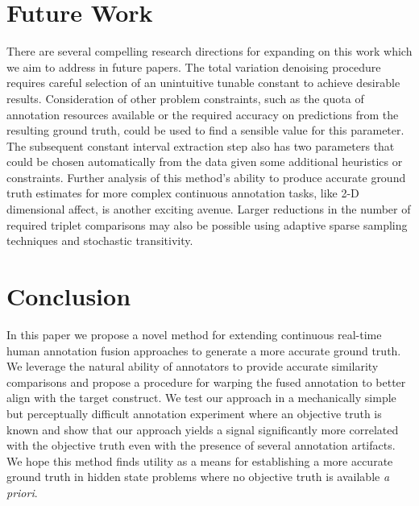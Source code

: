 \documentclass[times,twocolumn,final,authoryear]{elsarticle}
\begin{document}
\section{Future Work}
There are several compelling research directions for expanding on this work which we aim to address in future papers.  The total variation denoising procedure requires careful selection of an unintuitive tunable constant to achieve desirable results.  Consideration of other problem constraints, such as the quota of annotation resources available or the required accuracy on predictions from the resulting ground truth, could be used to find a sensible value for this parameter.  The subsequent constant interval extraction step also has two parameters that could be chosen automatically from the data given some additional heuristics or constraints.  Further analysis of this method's ability to produce accurate ground truth estimates for more complex continuous annotation tasks, like 2-D dimensional affect, is another exciting avenue.  Larger reductions in the number of required triplet comparisons may also be possible using adaptive sparse sampling techniques and stochastic transitivity.

\section{Conclusion}
In this paper we propose a novel method for extending continuous real-time human annotation fusion approaches to generate a more accurate ground truth.  We leverage the natural ability of annotators to provide accurate similarity comparisons and propose a procedure for warping the fused annotation to better align with the target construct.  We test our approach in a mechanically simple but perceptually difficult annotation experiment where an objective truth is known and show that our approach yields a signal significantly more correlated with the objective truth even with the presence of several annotation artifacts.  We hope this method finds utility as a means for establishing a more accurate ground truth in hidden state problems where no objective truth is available \textit{a priori}.
\end{document}
